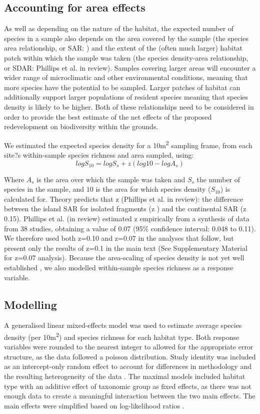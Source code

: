 \subsection{Accounting for area effects}
As well as depending on the nature of the habitat, the expected number of species in a sample also depends on the area covered by the sample (the species area relationship, or SAR: \citealt{rosenzweig:1995species}) and the extent of the (often much larger) habitat patch within which the sample was taken (the species density-area relationship, or SDAR: Phillips et al. in review). Samples covering larger areas will encounter a wider range of microclimatic and other environmental conditions, meaning that more species have the potential to be sampled. Larger patches of habitat can additionally support larger populations of resident species meaning that species density is likely to be higher. Both of these relationships need to be considered in order to provide the best estimate of the net effects of the proposed redevelopment on biodiversity within the grounds.

We estimated the expected species density for a 10m\textsuperscript{2} sampling frame, from each site?s within-sample species richness and area sampled, using: 
\begin{equation}
log S_{10} = log S_s + z(log 10 - log A_s)
\end{equation}


Where $A_s$ is the area over which the sample was taken and $S_s$ the number of species in the sample, and $10$ is the area for which species density ($S_{10}$) is calculated for. Theory predicts that z  (Phillips et al. in review): the difference between the island SAR for isolated fragments (z ) and the continental SAR (z  0.15). Phillips et al. (in review) estimated z empirically from a synthesis of data from 38 studies, obtaining a value of 0.07 (95\% confidence interval: 0.048 to 0.11). We therefore used both z=0.10 and z=0.07 in the analyses that follow, but present only the results of z=0.1 in the main text (See Supplementary Material for z=0.07 analysis).  Because the area-scaling of species density is not yet well established \citep[e.g.][]{Giladi:2014bio}, we also modelled within-sample species richness as a response variable.

\subsection{Modelling}
A generalised linear mixed-effects model was used to estimate average species density (per 10m\textsuperscript{2}) and species richness for each habitat type. Both response variables were rounded to the nearest integer to allowed for the appropriate error structure, as the data followed a poisson distribution. Study identity was included as an intercept-only random effect to account for differences in methodology and the resulting heterogeneity of the data \citep{Zuur:2009me}. The maximal models included habitat type with an additive effect of taxonomic group as fixed effects, as there was not enough data to create a meaningful interaction between the two main effects. The main effects were simplified based on log-likelihood ratios \citep{Zuur:2009me, Crawley:2012r}.

